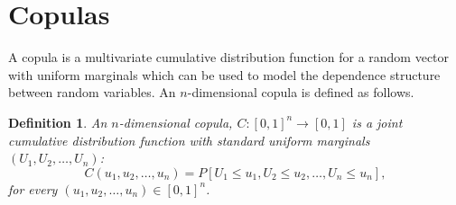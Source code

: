 \documentclass{article}
\newtheorem{definition}{Definition}
\begin{document}
\section{Copulas}
A copula is a multivariate cumulative distribution function for a random vector with uniform marginals which can be used to model the dependence structure between random variables. An $n$-dimensional copula is defined as follows.
\\
\begin{definition}\cite[Definition 1]{Copulas}
    An $n$-dimensional copula, $C: [0,1]^n \rightarrow [0,1]$ is a joint cumulative distribution function with standard uniform marginals $(U_1,U_2,\dots,U_n)$:
    $$C(u_1,u_2,\dots,u_n) = P[U_1\leq u_1, U_2\leq u_2,\dots, U_n \leq u_n],$$
    for every $(u_1,u_2,\dots,u_n)\in [0,1]^n$.
\end{definition}
\end{document}
